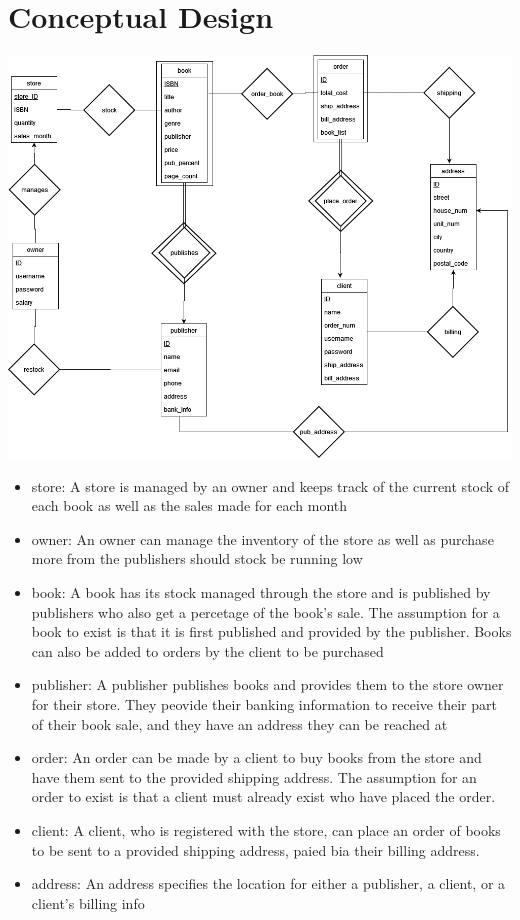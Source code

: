 \documentclass[Project Report]{article}
\begin{document}
\section{Conceptual Design}
{\centering \includegraphics[width=\textwidth]{ER_Diagram.png}}
\begin{itemize}
    \item store: A store is managed by an owner and keeps track of the current stock of each book as well as the sales made for each month
    \item owner: An owner can manage the inventory of the store as well as purchase more from the publishers should stock be running low
    \item book: A book has its stock managed through the store and is published by publishers who also get a percetage of the book's sale. The assumption for a book to exist is that it is first published and provided by the publisher. Books can also be added to orders by the client to be purchased
    \item publisher: A publisher publishes books and provides them to the store owner for their store. They peovide their banking information to receive their part of their book sale, and they have an address they can be reached at
    \item order: An order can be made by a client to buy books from the store and have them sent to the provided shipping address. The assumption for an order to exist is that a client must already exist who have placed the order.
    \item client: A client, who is registered with the store, can place an order of books to be sent to a provided shipping address, paied bia their billing address.
    \item address: An address specifies the location for either a publisher, a client, or a client's billing info
\end{itemize}
\end{document}
